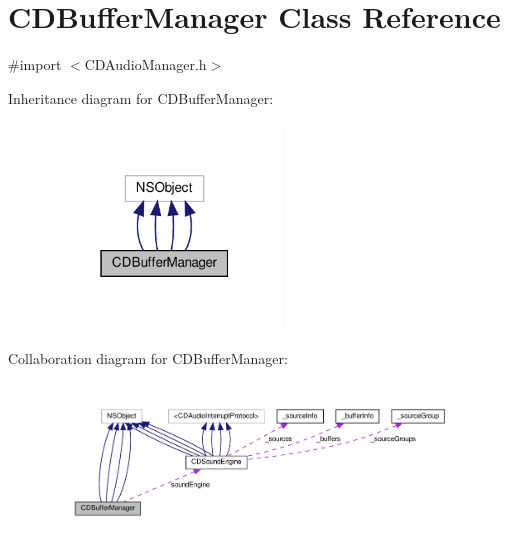 \hypertarget{interfaceCDBufferManager}{}\section{C\+D\+Buffer\+Manager Class Reference}
\label{interfaceCDBufferManager}


{\ttfamily \#import $<$C\+D\+Audio\+Manager.\+h$>$}



Inheritance diagram for C\+D\+Buffer\+Manager\+:
\nopagebreak
\begin{figure}[H]
\begin{center}
\leavevmode
\includegraphics[width=175pt]{interfaceCDBufferManager__inherit__graph}
\end{center}
\end{figure}


Collaboration diagram for C\+D\+Buffer\+Manager\+:
\nopagebreak
\begin{figure}[H]
\begin{center}
\leavevmode
\includegraphics[width=350pt]{interfaceCDBufferManager__coll__graph}
\end{center}
\end{figure}
